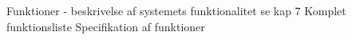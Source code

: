 Funktioner - beskrivelse af systemets funktionalitet se kap 7
	Komplet funktionsliste
	Specifikation af funktioner